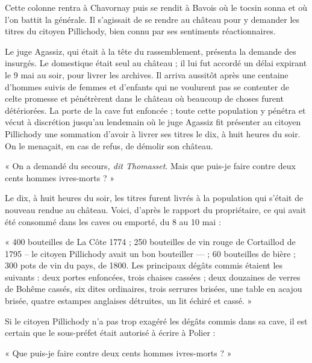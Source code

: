 \documentclass[french,twoside]{book} %
\newenvironment{quoteblock}%
  {\begin{quoting}}
  {\end{quoting}}
\newenvironment{quotebar}{%
    \def\FrameCommand{{\color{rubric!10!}\vrule width 0.5em} \hspace{0.9em}}%
    \def\OuterFrameSep{\itemsep} %
    \MakeFramed {\advance\hsize-\width \FrameRestore}
  }%
  {%
    \endMakeFramed
  }
\renewenvironment{quoteblock}%
  {%
    \savenotes
    \setstretch{0.9}
    \begin{quotebar}
  }
  {%
    \end{quotebar}
    \spewnotes
  }
\begin{document}
\noindent Cette colonne rentra à Chavornay puis se rendit à Bavois où le tocsin sonna et où l’on battit la générale. Il s’agissait de se rendre au château pour y demander les titres du citoyen Pillichody, bien connu par ses sentiments réactionnaires.\par
Le juge Agassiz, qui était à la tête du rassemblement, présenta la demande des insurgés. Le domestique était seul au château ; il lui fut accordé un délai expirant le 9 mai au soir, pour livrer les archives. Il arriva aussitôt après une centaine d’hommes suivis de femmes et d’enfants qui ne voulurent pas se contenter de celte promesse et pénétrèrent dans le château où beaucoup de choses furent détériorées. La porte de la cave fut enfoncée ; toute cette population y pénétra et vécut à discrétion jusqu’au lendemain où le juge Agassiz fit présenter au citoyen Pillichody une sommation d’avoir à livrer ses titres le dix, à huit heures du soir. On le menaçait, en cas de refus, de démolir son château.\par

\begin{quoteblock}
\noindent « On a demandé du secours\emph{, dit Thomasset}. Mais que puis-je faire contre deux cents hommes ivres-morts ? »\end{quoteblock}

\noindent Le dix, à huit heures du soir, les titres furent livrés à la population qui s’était de nouveau rendue au château. Voici, d’après le rapport du propriétaire, ce qui avait été consommé dans les caves ou emporté, du 8 au 10 mai :\par

\begin{quoteblock}
\noindent « 400 bouteilles de La Côte 1774 ; 250 bouteilles de vin rouge de Cortaillod de 1795 – le citoyen Pillichody avait un bon bouteiller — ; 60 bouteilles de bière ; 300 pots de vin du pays, de 1800. Les principaux dégâts commis étaient les suivants : deux portes enfoncées, trois chaises cassées ; deux douzaines de verres de Bohême cassés, six dites ordinaires, trois serrures brisées, une table en acajou brisée, quatre estampes anglaises détruites, un lit échiré et cassé. »\end{quoteblock}

\noindent Si le citoyen Pillichody n’a pas trop exagéré les dégâts commis dans sa cave, il est certain que le sous-préfet était autorisé à écrire à Polier :\par

\begin{quoteblock}
\noindent « Que puis-je faire contre deux cents hommes ivres-morts ? »\end{quoteblock}
\end{document}
